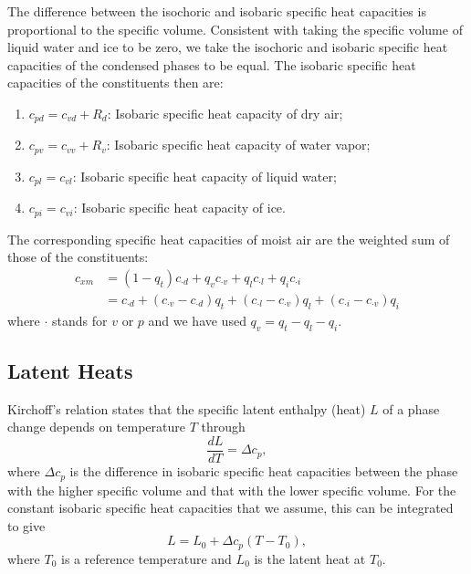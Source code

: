 \documentclass{article}
\begin{document}
The difference between the isochoric and isobaric specific heat capacities is proportional to the specific volume. Consistent with taking the specific volume of liquid water and ice to be zero, we take the isochoric and isobaric specific heat capacities of the condensed phases to be equal. The isobaric specific heat capacities of the constituents then are:
\begin{enumerate}
    \item $c_{pd} = c_{vd} + R_d$: Isobaric specific heat capacity of dry air;
    \item $c_{pv} = c_{vv} + R_v$: Isobaric specific heat capacity of water vapor;
    \item $c_{pl} = c_{vl}$: Isobaric specific heat capacity of liquid water;
    \item $c_{pi} = c_{vi}$: Isobaric specific heat capacity of ice.
\end{enumerate}

The corresponding specific heat capacities of moist air are the weighted sum of those of the constituents:
\begin{align}
    c_{x m} & = (1-q_t) c_{\cdot d} + q_v c_{\cdot v} + q_l c_{\cdot l} + q_i c_{\cdot i}\\
    & = c_{\cdot d} + (c_{\cdot v} - c_{\cdot d})q_t + (c_{\cdot l} - c_{\cdot v})q_l + (c_{\cdot i} - c_{\cdot v})q_i
\end{align}
where $\cdot$ stands for $v$ or $p$ and we have used $q_v = q_t -q_l - q_i$.

\subsection{Latent Heats}

Kirchoff's relation states that the specific latent enthalpy (heat) $L$ of a phase change depends on temperature $T$ through
\begin{equation}
    \frac{dL}{dT} = \Delta c_p,
\end{equation}
where $\Delta c_p$ is the difference in isobaric specific heat capacities between the phase with the higher specific volume and that with the lower specific volume. For the constant isobaric specific heat capacities that we assume, this can be integrated to give
\begin{equation}
    L = L_0 + \Delta c_p (T-T_0),
    \label{eq:LH_temperature}
\end{equation}
where $T_0$ is a reference temperature and $L_0$ is the latent heat at $T_0$. 
\end{document}
